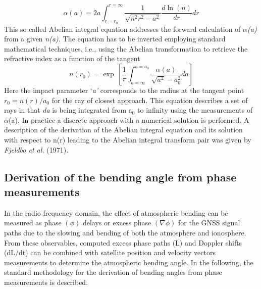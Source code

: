 \documentclass[a4paper,12pt,twoside]{article}
\begin{document}
\begin{equation}
	\alpha \left(a\right)=2a\int _{r=r_{0} }^{r=\infty }\frac{1}{\sqrt{n^{2} r^{2} -a^{2} } }  \frac{d\ln (n)}{dr} dr
\end{equation}
This so called Abelian integral equation addresses the forward calculation of \textit{$\alpha$(a)} from a given \textit{n(a).} The equation has to be inverted employing standard mathematical techniques, i.e., using the Abelian transformation to retrieve the refractive index as a function of the tangent 
\begin{equation}
	n\left(r_{0} \right)=\exp \, \left[\frac{1}{\pi } \int _{a=\infty }^{a=a_{0} }\frac{\alpha \left(a\right)}{\sqrt{a^{2} } -a_{0}^{2} }  da\right]
\end{equation}
Here the impact parameter `\textit{a'} corresponds to the radius at the tangent point $r_{0} =n(r)/a_{0}$ for the ray of closest approach. This equation describes a set of rays in that \textit{da} is being integrated from a${}_{0}$ to infinity using the measurements of $\alpha$(a). In practice a discrete approach with a numerical solution is performed. A description of the derivation of the Abelian integral equation and its solution with respect to n(r) leading to the Abelian integral transform pair was given by \textit{Fjeldbo et al.} (1971). 

\subsection{Derivation of the bending angle from phase measurements}

\noindent In the radio frequency domain, the effect of atmospheric bending can be measured as phase $(\phi)$ delays or excess phase $(\nabla \phi)$ for the GNSS signal paths due to the slowing and bending of both the atmosphere and ionosphere. From these observables, computed excess phase paths (L) and Doppler shifts (dL/dt) can be combined with satellite position and velocity vectors measurements to determine the atmospheric bending angle. In the following, the standard methodology for the derivation of bending angles from phase measurements is described.\\
\end{document}
